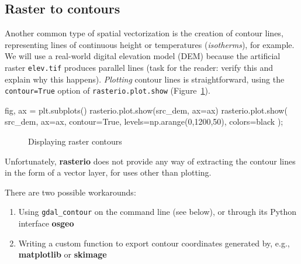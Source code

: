 \documentclass[
  letterpaper,
]{krantz}
\newenvironment{Shaded}{\begin{snugshade}}{\end{snugshade}}
\newcommand{\DecValTok}[1]{\textcolor[rgb]{0.68,0.00,0.00}{#1}}
\newcommand{\NormalTok}[1]{\textcolor[rgb]{0.00,0.23,0.31}{#1}}
\newcommand{\OperatorTok}[1]{\textcolor[rgb]{0.37,0.37,0.37}{#1}}
\newcommand{\StringTok}[1]{\textcolor[rgb]{0.13,0.47,0.30}{#1}}
\newcommand{\VariableTok}[1]{\textcolor[rgb]{0.07,0.07,0.07}{#1}}
\providecommand{\tightlist}{%
  \setlength{\itemsep}{0pt}\setlength{\parskip}{0pt}}\usepackage{longtable,booktabs,array}
\begin{document}
\subsection{Raster to contours}\label{sec-raster-to-contours}

Another common type of spatial vectorization is the creation of contour
lines, representing lines of continuous height or temperatures
(\emph{isotherms}), for example. We will use a real-world digital
elevation model (DEM) because the artificial raster \texttt{elev.tif}
produces parallel lines (task for the reader: verify this and explain
why this happens). \emph{Plotting} contour lines is straightforward,
using the \texttt{contour=True} option of \texttt{rasterio.plot.show}
(Figure~\ref{fig-raster-contours1}).

\begin{Shaded}
\begin{Highlighting}[]
\NormalTok{fig, ax }\OperatorTok{=}\NormalTok{ plt.subplots()}
\NormalTok{rasterio.plot.show(src\_dem, ax}\OperatorTok{=}\NormalTok{ax)}
\NormalTok{rasterio.plot.show(}
\NormalTok{    src\_dem, }
\NormalTok{    ax}\OperatorTok{=}\NormalTok{ax, }
\NormalTok{    contour}\OperatorTok{=}\VariableTok{True}\NormalTok{, }
\NormalTok{    levels}\OperatorTok{=}\NormalTok{np.arange(}\DecValTok{0}\NormalTok{,}\DecValTok{1200}\NormalTok{,}\DecValTok{50}\NormalTok{), }
\NormalTok{    colors}\OperatorTok{=}\StringTok{\textquotesingle{}black\textquotesingle{}}
\NormalTok{)}\OperatorTok{;}
\end{Highlighting}
\end{Shaded}

\begin{figure}[H]


\caption{\label{fig-raster-contours1}Displaying raster contours}

\end{figure}%

Unfortunately, \textbf{rasterio} does not provide any way of extracting
the contour lines in the form of a vector layer, for uses other than
plotting.

There are two possible workarounds:

\begin{enumerate}
\def\labelenumi{\arabic{enumi}.}
\tightlist
\item
  Using \texttt{gdal\_contour} on the command line (see below), or
  through its Python interface \textbf{osgeo}
\item
  Writing a custom function to export contour coordinates generated by,
  e.g., \textbf{matplotlib} or \textbf{skimage}
\end{enumerate}
\end{document}

